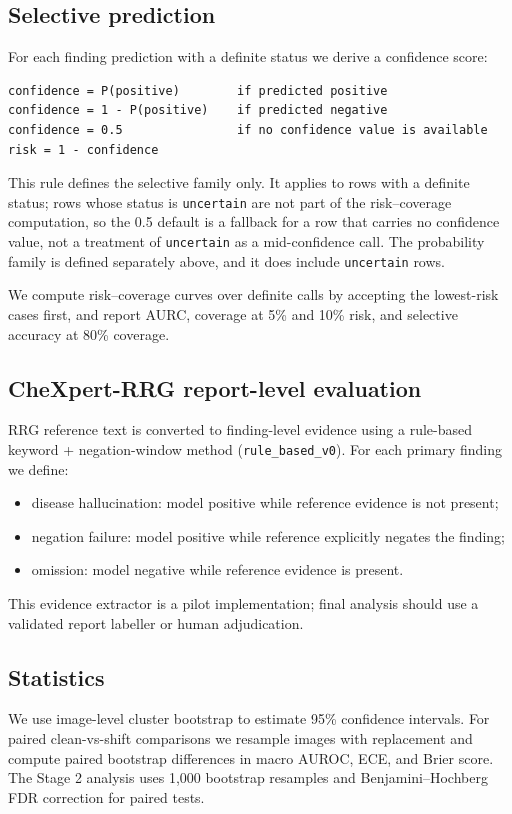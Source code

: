 \subsection{Selective prediction}

For each finding prediction with a definite status we derive a confidence score:

\begin{verbatim}
confidence = P(positive)        if predicted positive
confidence = 1 - P(positive)    if predicted negative
confidence = 0.5                if no confidence value is available
risk = 1 - confidence
\end{verbatim}

This rule defines the selective family only. It applies to rows with a definite status; rows whose status is \texttt{uncertain} are not part of the risk--coverage computation, so the 0.5 default is a fallback for a row that carries no confidence value, not a treatment of \texttt{uncertain} as a mid-confidence call. The probability family is defined separately above, and it does include \texttt{uncertain} rows.

We compute risk--coverage curves over definite calls by accepting the lowest-risk cases first, and report AURC, coverage at 5\% and 10\% risk, and selective accuracy at 80\% coverage.

\subsection{CheXpert-RRG report-level evaluation}

RRG reference text is converted to finding-level evidence using a rule-based keyword + negation-window method (\texttt{rule\_based\_v0}). For each primary finding we define:

\begin{itemize}
\item disease hallucination: model positive while reference evidence is not present;
\item negation failure: model positive while reference explicitly negates the finding;
\item omission: model negative while reference evidence is present.
\end{itemize}

This evidence extractor is a pilot implementation; final analysis should use a validated report labeller or human adjudication.

\subsection{Statistics}

We use image-level cluster bootstrap to estimate 95\% confidence intervals. For paired clean-vs-shift comparisons we resample images with replacement and compute paired bootstrap differences in macro AUROC, ECE, and Brier score. The Stage 2 analysis uses 1,000 bootstrap resamples and Benjamini--Hochberg FDR correction for paired tests.
